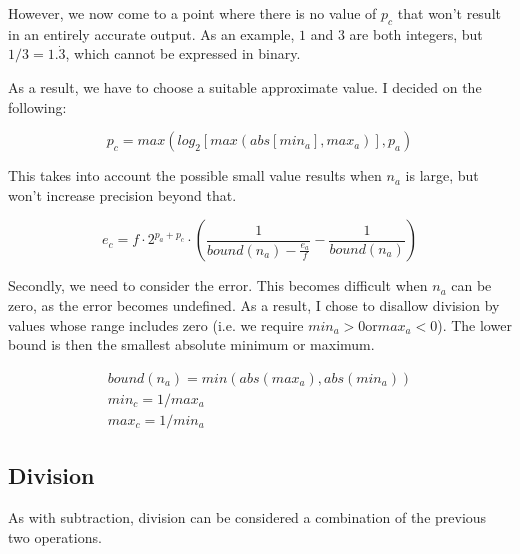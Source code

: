 \documentclass[10pt,a4paper]{article}
\numberwithin{equation}{section}
\numberwithin{equation}{subsection}
\begin{document}
	However, we now come to a point where there is no value of $p_c$ that won't result in an entirely accurate output. As an example, $1$ and $3$ are both integers, but $1/3 = 1.\dot{3}$, which cannot be expressed in binary.
	
	As a result, we have to choose a suitable approximate value. I decided on the following:
	
	\begin{equation}
		p_c = max(log_2[max(abs[min_a], max_a)], p_a)
	\end{equation}
	
	This takes into account the possible small value results when $n_a$ is large, but won't increase precision beyond that.
	
	\begin{equation}
		e_c = f\cdot 2^{p_a+p_c}\cdot \left(\frac{1}{bound(n_a) - \frac{e_a}{f}} - \frac{1}{bound(n_a)}\right)
	\end{equation}
	
	Secondly, we need to consider the error. This becomes difficult when $n_a$ can be zero, as the error becomes undefined. As a result, I chose to disallow division by values whose range includes zero (i.e. we require $min_a > 0 \text{or} max_a < 0$). The lower bound is then the smallest absolute minimum or maximum.
	
	\begin{eqnarray}
		bound(n_a) = min(abs(max_a),abs(min_a)) \\
		min_c = 1/max_a \\
		max_c = 1/min_a
	\end{eqnarray}
	
	\subsection{Division}
	
	As with subtraction, division can be considered a combination of the previous two operations.
	
	
	
\end{document}
